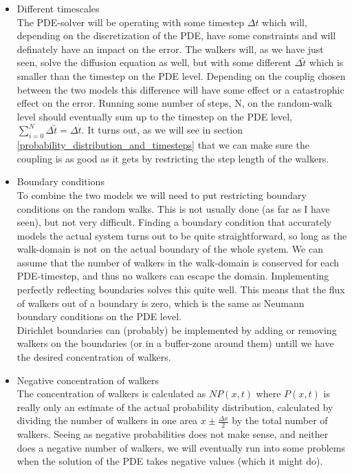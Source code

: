 \begin{itemize}
 \item Different timescales\\
  The PDE-solver will be operating with some timestep $\Delta t$ which will, depending on the discretization of the PDE, have some constraints and will definately have an impact on the error. 
  The walkers will, as we have just seen, solve the diffusion equation as well, but with some different $\Delta \tilde{t}$ which is smaller than the timestep on the PDE level. 
  Depending on the couplig chosen between the two models this difference will have some effect or a catastrophic effect on the error. 
  Running some number of steps, N, on the random-walk level should eventually sum up to the timestep on the PDE level, $\sum\limits_{i=0}^N \Delta\tilde{t} = \Delta t$. 
  It turns out, as we will see in section \ref{probability_distribution_and_timesteps} that we can make sure the coupling is as good as it gets by restricting the step length of the walkers.
 \item Boundary conditions\\
 To combine the two models we will need to put restricting boundary conditions on the random walks. This is not usually done (as far as I have seen), but not very difficult. 
 Finding a boundary condition that accurately models the actual system turns out to be quite straightforward, so long as the walk-domain is not on the actual boundary of the whole system. 
 We can assume that the number of walkers in the walk-domain is conserved for each PDE-timestep, and thus no walkers can escape the domain. 
 Implementing perfectly reflecting boundaries solves this quite well. 
 This means that the flux of walkers out of a boundary is zero, which is the same as Neumann boundary conditions on the PDE level. \\
 Dirichlet boundaries can (probably) be implemented by adding or removing walkers on the boundaries (or in a buffer-zone around them) untill we have the desired concentration of walkers.
 \item Negative concentration of walkers \\
 The concentration of walkers is calculated as $NP(x,t)$ where $P(x,t)$ is really only an estimate of the actual probability distribution, calculated by dividing the number of walkers in one area $x\pm\frac{\Delta x}{2}$ by the total number of walkers. 
 Seeing as negative probabilities does not make sense, and neither does a negative number of walkers, we will eventually run into some problems when the solution of the PDE takes negative values (which it might do). 

\end{itemize}
